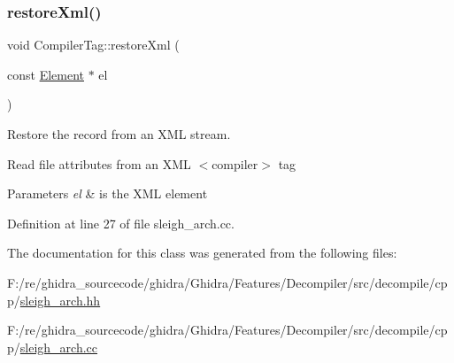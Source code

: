 \subsubsection{\texorpdfstring{restoreXml()}{restoreXml()}}
{\footnotesize\ttfamily void Compiler\+Tag\+::restore\+Xml (\begin{DoxyParamCaption}\item[{const \mbox{\hyperlink{class_element}{Element}} $\ast$}]{el }\end{DoxyParamCaption})}



Restore the record from an X\+ML stream. 

Read file attributes from an X\+ML $<$compiler$>$ tag 
\begin{DoxyParams}{Parameters}
{\em el} & is the X\+ML element \\
\hline
\end{DoxyParams}


Definition at line 27 of file sleigh\+\_\+arch.\+cc.



The documentation for this class was generated from the following files\+:\begin{DoxyCompactItemize}
\item 
F\+:/re/ghidra\+\_\+sourcecode/ghidra/\+Ghidra/\+Features/\+Decompiler/src/decompile/cpp/\mbox{\hyperlink{sleigh__arch_8hh}{sleigh\+\_\+arch.\+hh}}\item 
F\+:/re/ghidra\+\_\+sourcecode/ghidra/\+Ghidra/\+Features/\+Decompiler/src/decompile/cpp/\mbox{\hyperlink{sleigh__arch_8cc}{sleigh\+\_\+arch.\+cc}}\end{DoxyCompactItemize}
